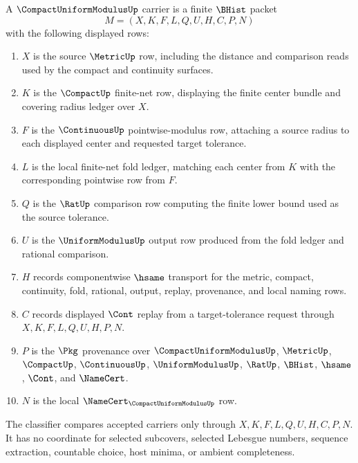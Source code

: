 \begin{definition}
\label{def:compact-uniform-modulus-namecert-carrier}
A $\CompactUniformModulusUp$ carrier is a finite $\BHist$ packet
$$
M=(X,K,F,L,Q,U,H,C,P,N)
$$
with the following displayed rows:
\begin{enumerate}
\item $X$ is the source $\MetricUp$ row, including the distance and comparison reads used by the compact and continuity surfaces.
\item $K$ is the $\CompactUp$ finite-net row, displaying the finite center bundle and covering radius ledger over $X$.
\item $F$ is the $\ContinuousUp$ pointwise-modulus row, attaching a source radius to each displayed center and requested target tolerance.
\item $L$ is the local finite-net fold ledger, matching each center from $K$ with the corresponding pointwise row from $F$.
\item $Q$ is the $\RatUp$ comparison row computing the finite lower bound used as the source tolerance.
\item $U$ is the $\UniformModulusUp$ output row produced from the fold ledger and rational comparison.
\item $H$ records componentwise $\hsame$ transport for the metric, compact, continuity, fold, rational, output, replay, provenance, and local naming rows.
\item $C$ records displayed $\Cont$ replay from a target-tolerance request through $X,K,F,L,Q,U,H,P,N$.
\item $P$ is the $\Pkg$ provenance over $\CompactUniformModulusUp$, $\MetricUp$, $\CompactUp$, $\ContinuousUp$, $\UniformModulusUp$, $\RatUp$, $\BHist$, $\hsame$, $\Cont$, and $\NameCert$.
\item $N$ is the local $\NameCert_{\CompactUniformModulusUp}$ row.
\end{enumerate}
The classifier compares accepted carriers only through $X,K,F,L,Q,U,H,C,P,N$. It has no coordinate for selected subcovers, selected Lebesgue numbers, sequence extraction, countable choice, host minima, or ambient completeness.
\end{definition}


